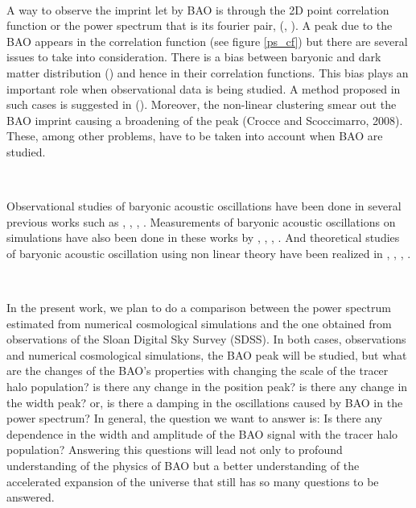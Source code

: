 \	

A way to observe the imprint let by BAO is through the 2D point correlation function or the power spectrum that is 
its fourier pair, (\cite{PLOT}, \cite{PLOT2}).  A peak due to the BAO appears in the correlation function (see figure \ref{ps_cf}) but there are 
several issues to take into consideration.
There is a bias between baryonic and dark matter distribution (\cite{Biases}) and hence in their correlation functions. This bias  
plays an important role when observational data 
is being studied. A method proposed in such cases is suggested in (\cite{HBM}). 
Moreover, the non-linear clustering smear out the BAO imprint causing a broadening of the peak (Crocce
and Scoccimarro, 2008). These, among other 
problems, have to be taken into account when BAO are studied. 

\

Observational studies of baryonic acoustic oscillations have been done in several previous works such 
as \cite{Obs01}, \cite{Obs02}, \cite{Obs03}, \cite{Obs04} . Measurements of baryonic acoustic oscillations on simulations 
have also been done in these works by \cite{Sim01}, \cite{Sim02}, \cite{Sim03}, \cite{Sim04}.
And theoretical studies of baryonic acoustic oscillation using non linear theory have been realized in \cite{Theo01}, \cite{Theo02},
\cite{Theo03}, \cite{last} .  

\

In the present work, we plan to do a comparison between the power spectrum estimated from numerical cosmological simulations
and the one obtained from observations of the Sloan Digital Sky Survey (SDSS). 
In both cases, observations and numerical cosmological simulations, the BAO 
peak will be studied, but what are the changes of the BAO's properties with changing the scale of the tracer halo population?
is there any change in the position peak? is there any change in the width peak? or, is there a damping in the oscillations
caused by BAO in the power spectrum? In general, the question we want to answer is: Is there any dependence in the width 
and amplitude of the BAO signal with the tracer halo population?
Answering this questions will lead not only to profound understanding of the physics of
BAO but a better understanding of the accelerated expansion of the universe that still has so many questions to be answered. 


